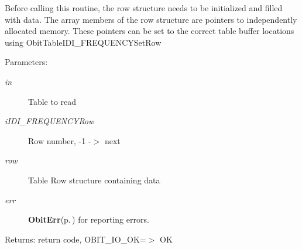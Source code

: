 Before calling this routine, the row structure needs to be initialized and filled with data. The array members of the row structure are pointers to independently allocated memory. These pointers can be set to the correct table buffer locations using Obit\-Table\-IDI\_\-FREQUENCYSet\-Row \begin{Desc}
\item[Parameters:]
\begin{description}
\item[{\em in}]Table to read \item[{\em i\-IDI\_\-FREQUENCYRow}]Row number, -1 -$>$ next \item[{\em row}]Table Row structure containing data \item[{\em err}]{\bf Obit\-Err}{\rm (p.\,\pageref{structObitErr})} for reporting errors. \end{description}
\end{Desc}
\begin{Desc}
\item[Returns:]return code, OBIT\_\-IO\_\-OK=$>$ OK \end{Desc}

